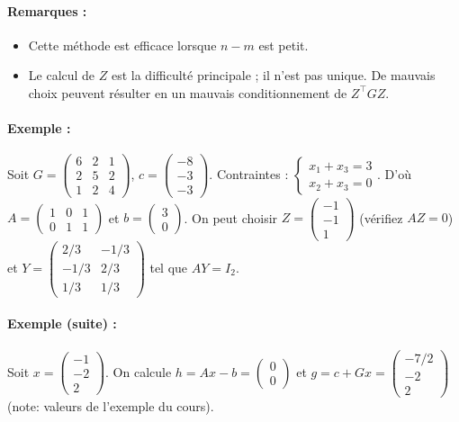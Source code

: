 \paragraph{Remarques :}
\begin{itemize}
    \item Cette méthode est efficace lorsque $n-m$ est petit.
    \item Le calcul de $Z$ est la difficulté principale ; il n'est pas unique. De mauvais choix peuvent résulter en un mauvais conditionnement de $Z^\top G Z$.
\end{itemize}

\paragraph{Exemple :}
Soit $G = \begin{pmatrix} 6 & 2 & 1 \\ 2 & 5 & 2 \\ 1 & 2 & 4 \end{pmatrix}$, $c = \begin{pmatrix} -8 \\ -3 \\ -3 \end{pmatrix}$. Contraintes : $\begin{cases} x_1 + x_3 = 3 \\ x_2 + x_3 = 0 \end{cases}$.
D'où $A = \begin{pmatrix} 1 & 0 & 1 \\ 0 & 1 & 1 \end{pmatrix}$ et $b = \begin{pmatrix} 3 \\ 0 \end{pmatrix}$.
On peut choisir $Z = \begin{pmatrix} -1 \\ -1 \\ 1 \end{pmatrix}$ (vérifiez $AZ=0$) et $Y = \begin{pmatrix} 2/3 & -1/3 \\ -1/3 & 2/3 \\ 1/3 & 1/3 \end{pmatrix}$ tel que $AY = I_2$.

\paragraph{Exemple (suite) :}
Soit $x = \begin{pmatrix} -1 \\ -2 \\ 2 \end{pmatrix}$.
On calcule $h = Ax - b = \begin{pmatrix} 0 \\ 0 \end{pmatrix}$ et $g = c + Gx = \begin{pmatrix} -7/2 \\ -2 \\ 2 \end{pmatrix}$ (note: valeurs de l'exemple du cours).

